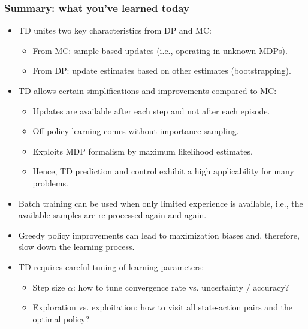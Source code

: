 \begin{frame}
	\frametitle{Summary: what you've learned today}
	\begin{itemize}
		\item TD unites two key characteristics from DP and MC:
		      \begin{itemize}
			      \item From MC: sample-based updates (i.e., operating in unknown MDPs).
			      \item From DP: update estimates based on other estimates (bootstrapping).
		      \end{itemize}\pause
		\item TD allows certain simplifications and improvements compared to MC:
		      \begin{itemize}
			      \item Updates are available after each step and not after each episode.\pause
			      \item Off-policy learning comes without importance sampling.\pause
			      \item Exploits MDP formalism by maximum likelihood estimates. \pause
			      \item Hence, TD prediction and control exhibit a high applicability for many problems.\pause
		      \end{itemize}
		\item Batch training can be used when only limited experience is available, i.e., the available samples are re-processed again and again.\pause
		\item Greedy policy improvements can lead to maximization biases and, therefore, slow down the learning process. \pause
		\item TD requires careful tuning of learning parameters:
		      \begin{itemize}
			      \item Step size $\alpha$: how to tune convergence rate vs. uncertainty / accuracy?
			      \item Exploration vs. exploitation: how to visit all state-action pairs and the optimal policy?
		      \end{itemize}
	\end{itemize}
\end{frame}
